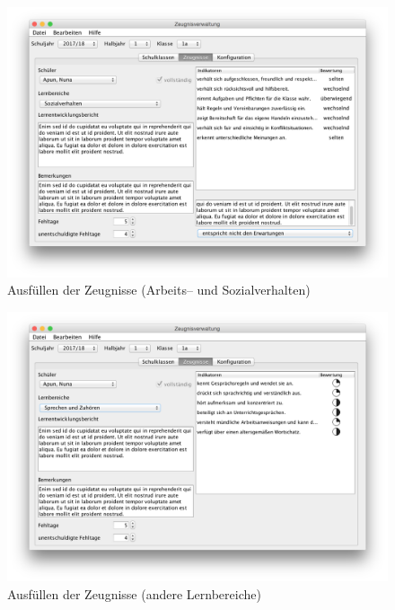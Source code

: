 \documentclass[a4paper,notitlepage,parskip]{scrartcl}
\begin{document}
\begin{figure}[H]
\centering
\centerline{\includegraphics[width=1.0\textwidth]{Zeugnisse.png}}
\caption{Ausfüllen der Zeugnisse (Arbeits-- und Sozialverhalten)}
\label{fig:Zeugnisse}
\end{figure}

\begin{figure}[H]
\centering
\centerline{\includegraphics[width=1.0\textwidth]{Zeugnisse2}}
\caption{Ausfüllen der Zeugnisse (andere Lernbereiche)}
\label{fig:Zeugnisse2}
\end{figure}
\end{document}
